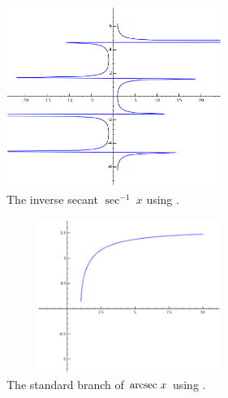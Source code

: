 

\begin{figure}[h!]
\begin{minipage}{\textwidth}
\begin{center}
\includegraphics[height=6cm,width=7cm]{arcsec3.eps}
\end{center}
\end{minipage}
\caption{The inverse secant $\sec^{-1}\ x$ using \sage.}
\label{fig:arcsec3}
\end{figure}

\begin{figure}[h!]
\begin{minipage}{\textwidth}
\begin{center}
\includegraphics[height=5cm,width=8cm]{arcsec2.eps}
\end{center}
\end{minipage}
\caption{The standard branch of $\arcsec\ x$ using \sage.}
\label{fig:arcsec2}
\end{figure}

